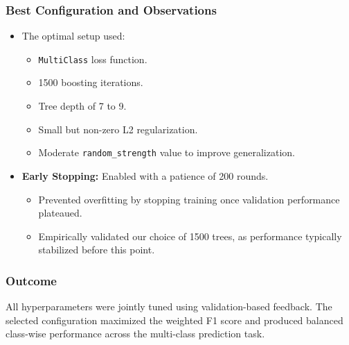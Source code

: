 \subsubsection*{Best Configuration and Observations}
\begin{itemize}[leftmargin=1.5em]
    \item The optimal setup used:
    \begin{itemize}
        \item \texttt{MultiClass} loss function.
        \item 1500 boosting iterations.
        \item Tree depth of 7 to 9.
        \item Small but non-zero L2 regularization.
        \item Moderate \texttt{random\_strength} value to improve generalization.
    \end{itemize}
    \item \textbf{Early Stopping:} Enabled with a patience of 200 rounds.
    \begin{itemize}
        \item Prevented overfitting by stopping training once validation performance plateaued.
        \item Empirically validated our choice of 1500 trees, as performance typically stabilized before this point.
    \end{itemize}
\end{itemize}

\subsubsection*{Outcome}
All hyperparameters were jointly tuned using validation-based feedback. The selected configuration maximized the weighted F1 score and produced balanced class-wise performance across the multi-class prediction task.




